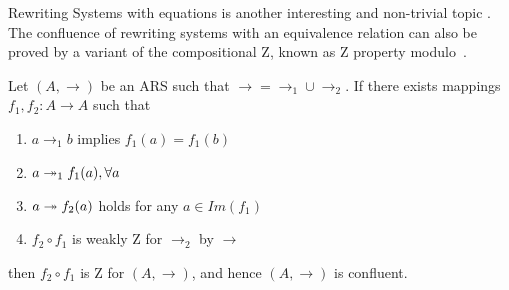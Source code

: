 Rewriting Systems with equations is another interesting and non-trivial topic \cite{winkler89,terese03}. The confluence of rewriting systems with an equivalence relation can also be proved by a variant of the compositional Z, known as Z property modulo~\cite{AK12b}.


    \begin{corollary}\cite{Nakazawa-Fujita2016}\label{cor:zcomp} Let $(A,\to)$ be an ARS such that $\to = \to_1 \cup \to_2$. If there exists mappings $f_1,f_2: A \to A$ such that \begin{enumerate} \item $a \to_1 b$ implies $f_1(a) = f_1(b)$ \item $a \twoheadrightarrow_1 f_1(a), \forall a$ \item $a \twoheadrightarrow f_2(a)$ holds for any $a\in Im(f_1)$ \item $f_2 \circ f_1$ is weakly Z for $\to_2$ by $\to$ \end{enumerate} then $f_2 \circ f_1$ is Z for $(A,\to)$, and hence $(A,\to)$ is confluent.  \end{corollary}


